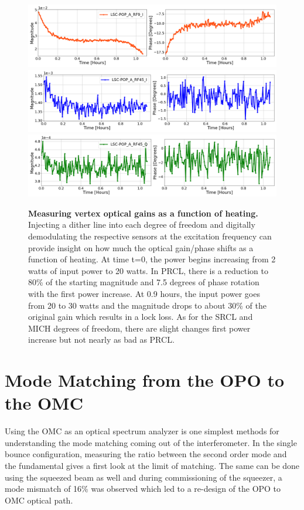 	\begin{figure}[t!]
		\centering
		\includegraphics[width=1.0 \textwidth]{../Figures/PRCL_EXC_LSC-POP_A_RF9_I.png}
		\includegraphics[width=1.0 \textwidth]{../Figures/SRCL_EXC_LSC-POP_A_RF45_I.png}
		\includegraphics[width=1.0 \textwidth]{../Figures/MICH_EXC_LSC-POP_A_RF45_Q.png}
		\caption[Measuring vertex optical gains as a function of heating.]  
		{\textbf{Measuring vertex optical gains as a function of heating.}
			Injecting a dither line into each degree of freedom and digitally demodulating the respective sensors at the excitation frequency can provide insight on how much the optical gain/phase shifts as a function of heating. At time t=0, the power begins increasing from 2 watts of input power to 20 watts. In PRCL, there is a reduction to 80\% of the starting magnitude and 7.5 degrees of phase rotation with the first power increase. At 0.9 hours, the input power goes from 20 to 30 watts and the magnitude drops to about 30\% of the original gain which results in a lock loss.  As for the SRCL and MICH degrees of freedom, there are slight changes first power increase but not nearly as bad as PRCL.
		}
		\label{fig:POP18_POP90}
	\end{figure}


\clearpage

\section{Mode Matching from the OPO to the OMC}
	Using the OMC as an optical spectrum analyzer is one simplest methods for understanding the mode matching coming out of the interferometer.  In the single bounce configuration, measuring the ratio between the second order mode and the fundamental gives a first look at the limit of matching.  The same can be done using the squeezed beam as well and during commissioning of the squeezer, a mode mismatch of 16\% was observed which led to a re-design of the OPO to OMC optical path.
	
